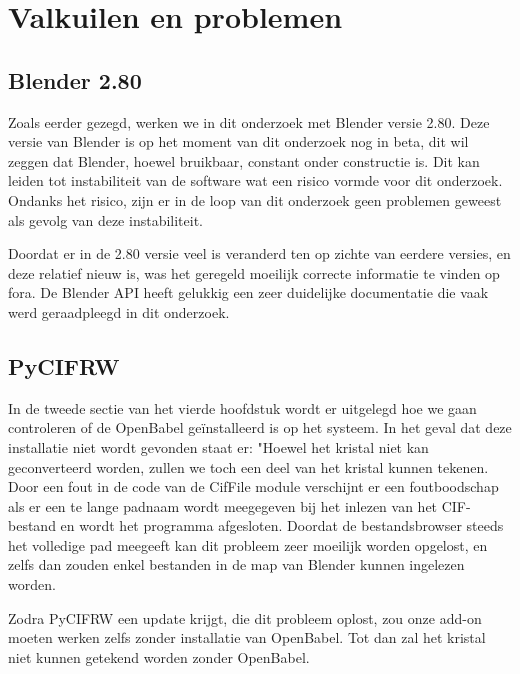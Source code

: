 \section{Valkuilen en problemen}

\subsection{Blender 2.80}
Zoals eerder gezegd, werken we in dit onderzoek met Blender versie 2.80. Deze versie van Blender is op het moment van dit onderzoek nog in beta, dit wil zeggen dat Blender, hoewel bruikbaar, constant onder constructie is. Dit kan leiden tot instabiliteit van de software wat een risico vormde voor dit onderzoek. Ondanks het risico, zijn er in de loop van dit onderzoek geen problemen geweest als gevolg van deze instabiliteit.
\par
Doordat er in de 2.80 versie veel is veranderd ten op zichte van eerdere versies, en deze relatief nieuw is, was het geregeld moeilijk correcte informatie te vinden op fora. De Blender API heeft gelukkig een zeer duidelijke documentatie die vaak werd geraadpleegd in dit onderzoek.\citep*{BLEN3} 
\par


\subsection{PyCIFRW}
In de tweede sectie van het vierde hoofdstuk wordt er uitgelegd hoe we gaan controleren of de OpenBabel geïnstalleerd is op het systeem. In het geval dat deze installatie niet wordt gevonden staat er: "Hoewel het kristal niet kan geconverteerd worden, zullen we toch een deel van het kristal kunnen tekenen. Door een fout in de code van de CifFile module verschijnt er een foutboodschap als er een te lange padnaam wordt meegegeven bij het inlezen van het CIF-bestand en wordt het programma afgesloten. Doordat de bestandsbrowser steeds het volledige pad meegeeft kan dit probleem zeer moeilijk worden opgelost, en zelfs dan zouden enkel bestanden in de map van Blender kunnen ingelezen worden. 
\par
Zodra PyCIFRW een update krijgt, die dit probleem oplost, zou onze add-on moeten werken zelfs zonder installatie van OpenBabel. Tot dan zal het kristal niet kunnen getekend worden zonder OpenBabel.

